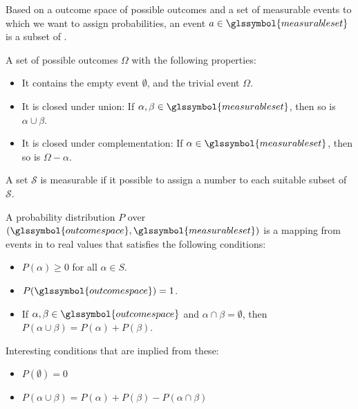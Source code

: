 
{%
  Based on a \gls{outcome space} of possible outcomes  and a set of measurable events  to which we want to assign probabilities, an event $a \in \glssymbol{measurable set}$ is a subset of .\\
}

{%
  A set of possible outcomes $\Omega$ with the following properties:
  \begin{itemize}
    \item It contains the empty event $\emptyset$, and the trivial event $\Omega$.
    \item It is closed under union: If $\alpha, \beta \in \glssymbol{measurable set}$, then so is $\alpha \cup \beta$.
    \item It is closed under complementation: If $\alpha \in \glssymbol{measurable set}$, then so is $\Omega - \alpha$.
  \end{itemize}
}

{%
  A set $\mathcal{S}$ is measurable if it possible to assign a number to each suitable subset of $\mathcal{S}$.
}

{%
  A probability distribution $P$ over $(\glssymbol{outcome space},\glssymbol{measurable set})$ is a mapping from events in  to real values that satisfies the following conditions:
  \begin{itemize}
    \item $P(\alpha)\geq 0 $ for all $ \alpha \in S$.
    \item $P(\glssymbol{outcome space})=1$.
    \item If $\alpha,\beta\in \glssymbol{outcome space}$ and $\alpha\cap\beta = \emptyset$, then $P(\alpha\cup\beta)=P(\alpha)+P(\beta)$.
  \end{itemize}
  Interesting conditions that are implied from these:
  \begin{itemize}
    \item $P(\emptyset)=0$
    \item $P(\alpha\cup\beta)=P(\alpha)+P(\beta)-P(\alpha\cap\beta)$
  \end{itemize}
}

